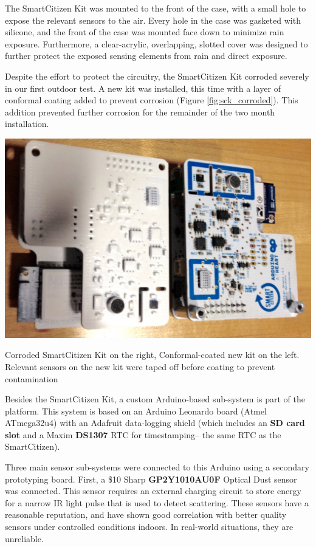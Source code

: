 The SmartCitizen Kit was mounted to the front of the case, with a small hole to expose the relevant sensors to the air.  Every hole in the case was gasketed with silicone, and the front of the case was mounted face down to minimize rain exposure.  Furthermore, a clear-acrylic, overlapping, slotted cover was designed to further protect the exposed sensing elements from rain and direct exposure.  

Despite the effort to protect the circuitry, the SmartCitizen Kit corroded severely in our first outdoor test.  A new kit was installed, this time with a layer of conformal coating added to prevent corrosion (Figure \ref{fig:sck_corroded}).  This addition prevented further corrosion for the remainder of the two month installation.    

\begin{marginfigure}
 	\includegraphics[width=\textwidth]{visuals/sck_conformal}               
 	 \caption{Corroded SmartCitizen Kit on the right, Conformal-coated new kit on the left.  Relevant sensors on the new kit were taped off before coating to prevent contamination}
  	\label{fig:sck_corroded}
\end{marginfigure}

Besides the SmartCitizen Kit, a custom Arduino-based sub-system is part of the platform.  This system is based on an Arduino Leonardo board (Atmel ATmega32u4) with an Adafruit data-logging shield (which includes an \textbf{SD card slot} and a Maxim \textbf{DS1307} RTC for timestamping-- the same RTC as the SmartCitizen). 

Three main sensor sub-systems were connected to this Arduino using a secondary prototyping board.  First, a \$10 Sharp \textbf{GP2Y1010AU0F} Optical Dust sensor was connected.  This sensor requires an external charging circuit to store energy for a narrow IR light pulse that is used to detect scattering.  These sensors have a reasonable reputation, and have shown good correlation with better quality sensors under controlled conditions indoors.  \cite{prabakar2015, austin2015} In real-world situations, they are unreliable.  

